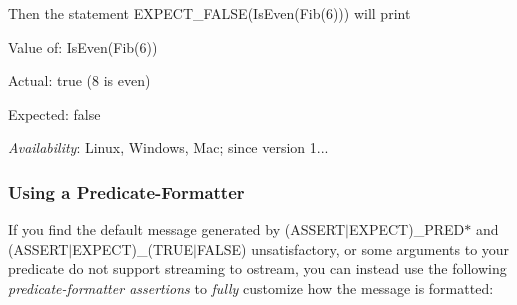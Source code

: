 Then the statement {\ttfamily E\+X\+P\+E\+C\+T\+\_\+\+F\+A\+L\+SE(Is\+Even(\+Fib(6)))} will print


\begin{DoxyPre}
Value of: IsEven(Fib(6))~\newline

Actual: true (8 is even)~\newline

Expected: false~\newline

\end{DoxyPre}


{\itshape Availability}\+: Linux, Windows, Mac; since version 1...

\subsubsection*{Using a Predicate-\/\+Formatter}

If you find the default message generated by {\ttfamily (A\+S\+S\+E\+R\+T$\vert$\+E\+X\+P\+E\+CT)\+\_\+\+P\+R\+E\+D$\ast$} and {\ttfamily (A\+S\+S\+E\+R\+T$\vert$\+E\+X\+P\+E\+CT)\+\_\+(T\+R\+U\+E$\vert$\+F\+A\+L\+SE)} unsatisfactory, or some arguments to your predicate do not support streaming to {\ttfamily ostream}, you can instead use the following {\itshape predicate-\/formatter assertions} to {\itshape fully} customize how the message is formatted\+:

